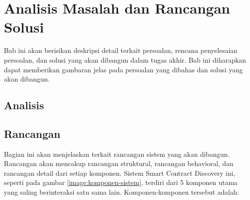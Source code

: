 \chapter{Analisis Masalah dan Rancangan Solusi}

Bab ini akan berisikan deskripsi detail terkait persoalan, rencana penyelesaian persoalan, dan solusi yang akan dibangun dalam tugas akhir. Bab ini diharapkan dapat memberikan gambaran jelas pada persoalan yang dibahas dan solusi yang akan dibangun.


\section{Analisis}







\break

\section{Rancangan}

Bagian ini akan menjelaskan terkait rancangan sistem yang akan dibangun. Rancangan akan mencakup rancangan struktural, rancangan behavioral, dan rancangan detail dari setiap komponen. Sistem Smart Contract Discovery ini, seperti pada gambar \ref{image:komponen-sistem}, terdiri dari 5 komponen utama yang saling berinteraksi satu sama lain. Komponen-komponen tersebut adalah:

